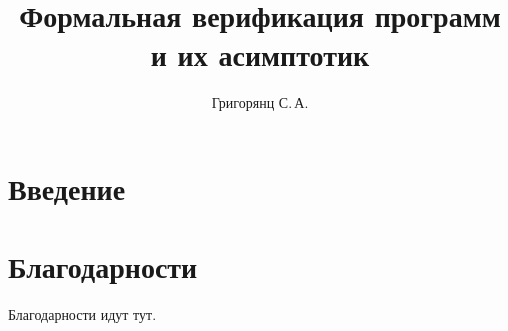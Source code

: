 \documentclass{mipt-thesis-bs}
\title{Формальная верификация программ и их асимптотик}
\author{Григорянц С.\,А.}
\begin{document}
\frontmatter
\titlecontents

\mainmatter


\chapter{Введение}



\backmatter

\printbib

\chapter{Благодарности}

Благодарности идут тут.
\end{document}
